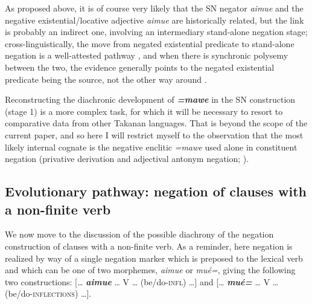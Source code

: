 \documentclass[output=paper,draft,draftmode,colorlinks,citecolor=brown]{langscibook}
\begin{document}
As proposed above, it is of course very likely that the SN negator
\textit{aimue} and the negative existential\slash locative adjective
\textit{aimue} are historically related, but the link is probably an
indirect one, involving an intermediary stand-alone negation stage;
cross-linguistically, the move from negated existential predicate to
stand-alone negation is a well-attested pathway 
\parencites[10,
13--14]{Croft1991}[127ff]{Veselinova2013}[155--156]{Veselinova2016},
and when there is synchronic polysemy between the two, the evidence
generally points to the negated existential predicate being the source, not
the other way around \citep[8]{Croft1991}.

Reconstructing the diachronic development of \textbf{\textit{=mawe}} in the
SN construction (stage 1) is a more complex task, for which it will be
necessary to resort to comparative data from other Takanan languages. That
is beyond the scope of the current paper, and so here I will restrict
myself to the observation that the most likely internal cognate is the
negative
enclitic \textit{=mawe} used alone in constituent negation (privative
derivation and adjectival antonym negation; ).

\subsection{Evolutionary pathway: negation of clauses with a non-finite
verb}\label{sec:tacana-10.2}

We now move to the discussion of the possible diachrony of the negation construction of clauses with a non-finite verb. As a reminder, here negation is realized by way of a single negation marker which is preposed to the lexical verb and which can be one of two morphemes, \textit{aimue} or \textit{mué=}, giving the following two constructions: [\textit{…} \textbf{\textit{aimue}} … V … (be/do-\textsc{infl}) …] and [… \textbf{\textit{mué=}} … V … (be/do-\textsc{inflections}) …].
\end{document}
